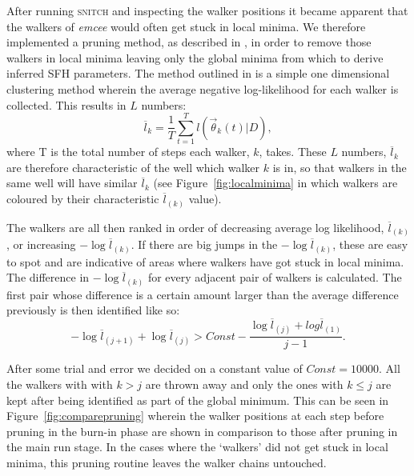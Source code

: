 \documentclass[useAMS,usenatbib]{mn2e}
\begin{document}
After running \textsc{snitch} and inspecting the walker positions it became apparent that the walkers of \emph{emcee} would often get stuck in local minima. We therefore implemented a pruning method, as described in \cite{hou12}, in order to remove those walkers in local minima leaving only the global minima from which to derive inferred SFH parameters. The method outlined in \cite{hou12} is a simple one dimensional clustering method wherein the average negative log-likelihood for each walker is collected. This results in $L$ numbers:
\begin{equation}\label{eq:lnumbers}
\overline{l}_k = \frac{1}{T} \sum^{T}_{t=1} l(\vec{\theta}_k(t)|D),
\end{equation}
where T is the total number of steps each walker, $k$, takes. These $L$ numbers, $\overline{l}_k$ are therefore characteristic of the well which walker $k$ is in, so that walkers in the same well will have similar $\overline{l}_k$ (see Figure~\ref{fig:localminima} in which walkers are coloured by their characteristic $\overline{l}_{(k)}$ value). 


The walkers are all then ranked in order of decreasing average log likelihood, $\overline{l}_{(k)}$, or increasing $- \log \overline{l}_{(k)}$. If there are big jumps in the $- \log \overline{l}_{(k)}$, these are easy to spot and are indicative of areas where walkers have got stuck in local minima. The difference in $- \log \overline{l}_{(k)}$ for every adjacent pair of walkers is calculated. The first pair whose difference is a certain amount larger than the average difference previously is then identified like so:
\begin{equation}\label{eq:idprunes}
-\log \overline{l}_{(j+1)} + \log \overline{l}_{(j)} > Const − \frac{\log \overline{l}_{(j)} + log \overline{l}_{(1)}}{j - 1}.
\end{equation}



After some trial and error we decided on a constant value of $Const = 10000$. All the walkers with with $k>j$ are thrown away and only the ones with $k \leq j$ are kept after being identified as part of the global minimum. This can be seen in Figure~\ref{fig:comparepruning} wherein the walker positions at each step before pruning in the burn-in phase are shown in comparison to those after pruning in the main run stage. In the cases where the `walkers' did not get stuck in local minima, this pruning routine leaves the walker chains untouched. 
\end{document}
